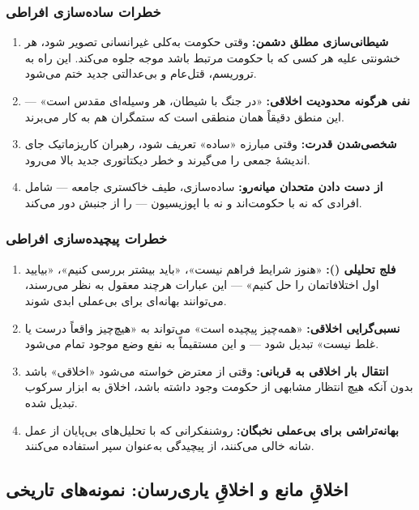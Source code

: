 \subsubsection{خطرات ساده‌سازی افراطی}
\begin{enumerate}
\item \textbf{شیطانی‌سازی مطلق دشمن:} وقتی حکومت به‌کلی غیرانسانی تصویر 
شود، هر خشونتی علیه هر کسی که با حکومت مرتبط باشد موجه جلوه می‌کند. 
این راه به تروریسم، قتل‌عام و بی‌عدالتی جدید ختم می‌شود.
\item \textbf{نفی هرگونه محدودیت اخلاقی:} «در جنگ با شیطان، هر وسیله‌ای 
مقدس است» — این منطق دقیقاً همان منطقی است که ستمگران هم به کار می‌برند.
\item \textbf{شخصی‌شدن قدرت:} وقتی مبارزه «ساده» تعریف شود، رهبران 
کاریزماتیک جای اندیشهٔ جمعی را می‌گیرند و خطر دیکتاتوری جدید بالا می‌رود.
\item \textbf{از دست دادن متحدان میانه‌رو:} ساده‌سازی، طیف خاکستری جامعه 
— شامل افرادی که نه با حکومت‌اند و نه با اپوزیسیون — را از جنبش دور می‌کند.
\end{enumerate}

\subsubsection{خطرات پیچیده‌سازی افراطی}
\begin{enumerate}
\item \textbf{فلج تحلیلی ():} «هنوز شرایط فراهم 
نیست»، «باید بیشتر بررسی کنیم»، «بیایید اول اختلافاتمان را حل کنیم» — 
این عبارات هرچند معقول به نظر می‌رسند، می‌توانند بهانه‌ای برای بی‌عملی 
ابدی شوند.
\item \textbf{نسبی‌گرایی اخلاقی:} «همه‌چیز پیچیده است» می‌تواند به 
«هیچ‌چیز واقعاً درست یا غلط نیست» تبدیل شود — و این مستقیماً به نفع 
وضع موجود تمام می‌شود.
\item \textbf{انتقال بار اخلاقی به قربانی:} وقتی از معترض خواسته می‌شود 
«اخلاقی» باشد بدون آنکه هیچ انتظار مشابهی از حکومت وجود داشته باشد، 
اخلاق به ابزار سرکوب تبدیل شده.
\item \textbf{بهانه‌تراشی برای بی‌عملی نخبگان:} روشنفکرانی که با تحلیل‌های 
بی‌پایان از عمل شانه خالی می‌کنند، از پیچیدگی به‌عنوان سپر استفاده می‌کنند.
\end{enumerate}

\subsection{اخلاقِ مانع و اخلاقِ یاری‌رسان: نمونه‌های تاریخی}

